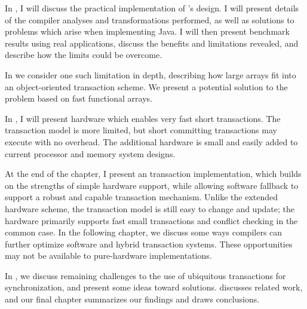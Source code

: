 In , I will discuss the practical implementation of
's design.  I will present details of the compiler
analyses and transformations performed, as well as solutions to
problems which arise when implementing Java.  I will then present
benchmark results using real applications, discuss the benefits and
limitations revealed, and describe how the limits could be overcome.

In  we consider one such limitation in depth,
describing how large arrays fit into an object-oriented transaction
scheme.  We present a potential solution to the problem based on
fast functional arrays.

In , I will present hardware which enables very fast
short transactions.  The transaction model is more limited, but short
committing transactions may execute with no overhead.  The additional
hardware is small and easily added to current processor and memory
system designs.


At the end of the chapter,
I present an  transaction implementation,
which builds on the strengths of simple hardware support, while
allowing software fallback to support a robust and capable transaction
mechanism.  Unlike the extended hardware scheme, the transaction model
is still easy to change and update; the hardware primarily supports
fast small transactions and conflict checking in the common case.
In the following chapter, we discuss some ways compilers can further
optimize software and hybrid transaction systems.  These opportunities
may not be available to pure-hardware implementations.

In , we discuss remaining challenges to the use of
ubiquitous transactions for synchronization, and present some ideas
toward solutions.  discusses related work, and our
final chapter summarizes our findings and draws conclusions.


